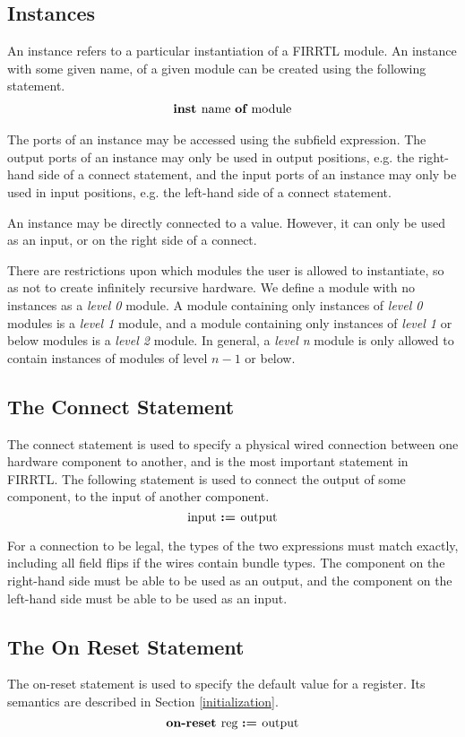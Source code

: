 \documentclass[12pt]{article}
\begin{document}
\subsection{Instances}
An instance refers to a particular instantiation of a FIRRTL module.
An instance with some given name, of a given module can be created using the following statement.
\[
\begin{aligned}
\text{\bf inst\ } \text{name } \text{\bf of\ } \text{module}
\end{aligned}
\]

The ports of an instance may be accessed using the subfield expression.
The output ports of an instance may only be used in output positions, e.g. the right-hand side of a connect statement, and the input ports of an instance may only be used in input positions, e.g. the left-hand side of a connect statement.

An instance may be directly connected to a value. However, it can only be used as an input, or on the right side of a connect.

There are restrictions upon which modules the user is allowed to instantiate, so as not to create infinitely recursive hardware.
We define a module with no instances as a {\em level 0} module.
A module containing only instances of {\em level 0} modules is a {\em level 1} module, and a module containing only instances of {\em level 1} or below modules is a {\em level 2} module.
In general, a {\em level n} module is only allowed to contain instances of modules of level $n-1$ or below. 

\subsection{The Connect Statement}
The connect statement is used to specify a physical wired connection between one hardware component to another, and is the most important statement in FIRRTL.
The following statement is used to connect the output of some component, to the input of another component. 
\[
\text{input } \text{\bf :=\ } \text{output} 
\]

For a connection to be legal, the types of the two expressions must match exactly, including all field flips if the wires contain bundle types.
The component on the right-hand side must be able to be used as an output, and the component on the left-hand side must be able to be used as an input.

\subsection{The On Reset Statement}
The on-reset statement is used to specify the default value for a register. Its semantics are described in Section \ref{initialization}.
\[
\text{\bf on-reset\ } \text{reg } \text{\bf :=\ } \text{output} 
\]
\end{document}

